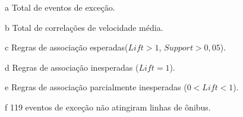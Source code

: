 \documentclass[
	12pt,				%
	oneside,			%
	a4paper,			%
	english,			%
	brazil				%
	]{abntex2ppgsi}
\begin{document}
{{\begin{apendicesenv}
\begin{table}[!htb]
\begin{threeparttable}
\begin{tablenotes}
            \item[a] Total de eventos de exceção.
            \item[b] Total de correlações de velocidade média.
            \item[c] Regras de associação esperadas($Lift > 1$, $Support > 0,05$).
            \item[d] Regras de associação inesperadas ($Lift = 1$).
            \item[e] Regras de associação parcialmente inesperadas ($0 < Lift < 1$).
            \item[f] 119 eventos de exceção não atingiram linhas de ônibus.
        \end{tablenotes}
\end{threeparttable}
\end{table}



\end{apendicesenv}}}
\end{document}
